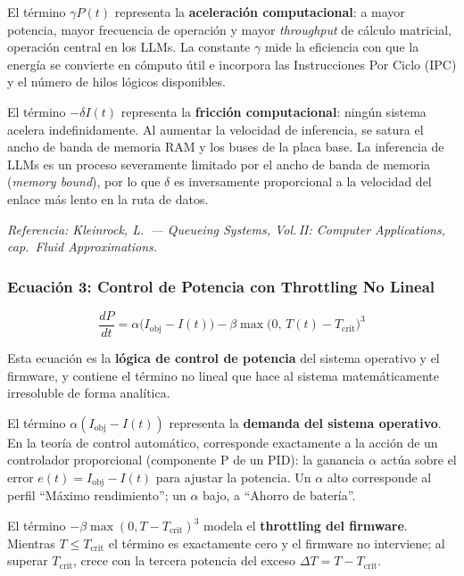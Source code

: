 \documentclass[10pt, twocolumn]{article}
\begin{document}
El término $\gamma P(t)$ representa la \textbf{aceleración computacional}: a mayor
potencia, mayor frecuencia de operación y mayor \emph{throughput} de cálculo
matricial, operación central en los LLMs. La constante $\gamma$ mide la eficiencia
con que la energía se convierte en cómputo útil e incorpora las Instrucciones Por
Ciclo (IPC) y el número de hilos lógicos disponibles.

El término $-\delta I(t)$ representa la \textbf{fricción computacional}: ningún
sistema acelera indefinidamente. Al aumentar la velocidad de inferencia, se satura
el ancho de banda de memoria RAM y los buses de la placa base. La inferencia de
LLMs es un proceso severamente limitado por el ancho de banda de memoria
(\emph{memory bound}), por lo que $\delta$ es inversamente proporcional a la
velocidad del enlace más lento en la ruta de datos.

\smallskip
\noindent\textit{Referencia: Kleinrock, L.\ --- \emph{Queueing Systems, Vol.\,II:
Computer Applications}, cap.\ Fluid Approximations.}

\subsubsection*{Ecuación 3: Control de Potencia con Throttling No Lineal}

\begin{equation}
  \frac{dP}{dt} = \alpha\bigl(I_{\text{obj}} - I(t)\bigr)
                 - \beta \max\!\bigl(0,\, T(t) - T_{\text{crit}}\bigr)^3
  \label{eq:potencia}
\end{equation}

Esta ecuación es la \textbf{lógica de control de potencia} del sistema operativo y
el firmware, y contiene el término no lineal que hace al sistema matemáticamente
irresoluble de forma analítica.

El término $\alpha(I_{\text{obj}} - I(t))$ representa la \textbf{demanda del
sistema operativo}. En la teoría de control automático, corresponde exactamente a
la acción de un controlador proporcional (componente P de un PID): la ganancia
$\alpha$ actúa sobre el error $e(t) = I_{\text{obj}} - I(t)$ para ajustar la
potencia. Un $\alpha$ alto corresponde al perfil ``Máximo rendimiento''; un $\alpha$
bajo, a ``Ahorro de batería''.

El término $-\beta\max(0, T - T_{\text{crit}})^3$ modela el \textbf{throttling del
firmware}. Mientras $T \leq T_{\text{crit}}$ el término es exactamente cero y el
firmware no interviene; al superar $T_{\text{crit}}$, crece con la tercera potencia
del exceso $\Delta T = T - T_{\text{crit}}$.
\end{document}
